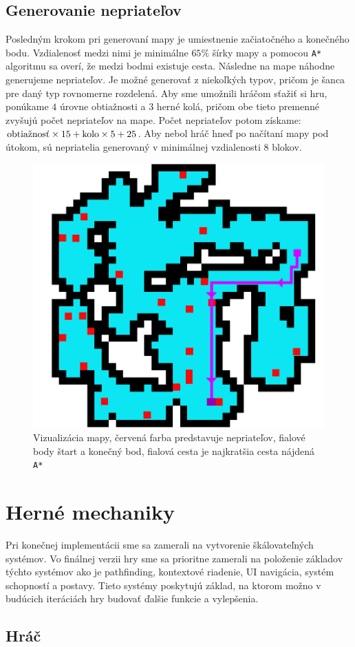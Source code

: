 \subsection{Generovanie nepriateľov}

Posledným krokom pri generovaní mapy je umiestnenie začiatočného a konečného bodu. Vzdialenosť medzi nimi je minimálne $65\%$ šírky mapy a pomocou \verb|A*| algoritmu sa overí, že medzi bodmi existuje cesta. Následne na mape náhodne generujeme nepriateľov. Je možné generovať z niekoľkých typov, pričom je šanca pre daný typ rovnomerne rozdelená. Aby sme umožnili hráčom sťažiť si hru, ponúkame $4$ úrovne obtiažnosti a $3$ herné kolá, pričom obe tieto premenné zvyšujú počet nepriateľov na mape. Počet nepriateľov potom získame: $\textnormal{obtiažnosť} \times 15 + \textnormal{kolo} \times 5 + 25$. Aby nebol hráč hneď po načítaní mapy pod útokom, sú nepriatelia generovaný v minimálnej vzdialenosti $8$ blokov.

\begin{figure} [H]
    \centering
    \includegraphics[width=0.45\linewidth]{obrazky-figures/enemies.png}
    \caption{Vizualizácia mapy, červená farba predstavuje nepriateľov, fialové body štart a konečný bod, fialová cesta je najkratšia cesta nájdená \texttt{A*}}
    \label{fig:enemies}
\end{figure}

\section{Herné mechaniky}

Pri konečnej implementácii sme sa zamerali na vytvorenie škálovateľných systémov. Vo finálnej verzii hry sme sa prioritne zamerali na položenie základov týchto systémov ako je pathfinding, kontextové riadenie, UI navigácia, systém schopností a postavy. Tieto systémy poskytujú základ, na ktorom možno v budúcich iteráciách hry budovať ďalšie funkcie a vylepšenia. 

\subsection{Hráč}

